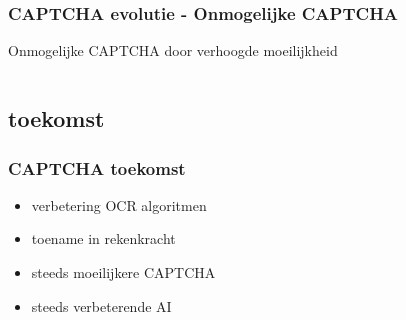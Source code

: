 \documentclass{beamer}
\begin{document}
\begin{frame}
  \frametitle{CAPTCHA evolutie - Onmogelijke CAPTCHA}
  \transfade
  Onmogelijke CAPTCHA door verhoogde moeilijkheid
  \begin{columns}[c]
       \begin{center}
      \end{center}
     \begin{center}
      \end{center}
  \end{columns}
\end{frame}
\subsection{toekomst}
\begin{frame}
  \frametitle{CAPTCHA toekomst}
  \transfade
  \begin{itemize}
    \item<+-> verbetering OCR algoritmen
    \item<+-> toename in rekenkracht
  \end{itemize}
  \vfill  
  \begin{itemize}
    \item<+-> steeds moeilijkere CAPTCHA
    \item<+-> steeds verbeterende AI
  \end{itemize}
\end{frame}
\end{document}
